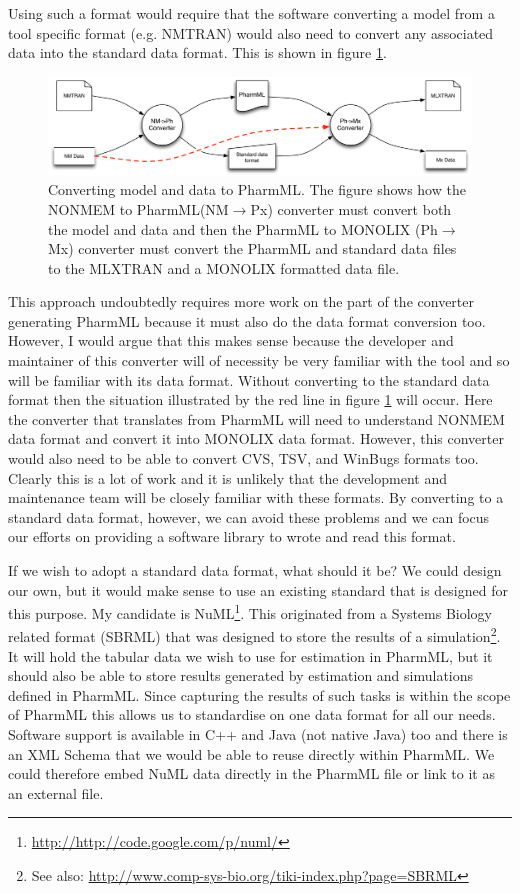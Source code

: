\documentclass[a4paper,11pt]{article}
\newcommand{\pharmml}{PharmML\xspace}
\begin{document}
Using such a format would require that the software converting a model
from a tool specific format (e.g. NMTRAN) would also need to convert
any associated data into the standard data format. This is shown in
figure \ref{fig:data-conversion}.

\begin{figure}[htbp]
\centering
\includegraphics[width=\linewidth]{DataConversion}
\caption{Converting model and data to \pharmml. The figure shows how
  the NONMEM to \pharmml (NM$\rightarrow$Px) converter must convert both the
  model and data and then the \pharmml to MONOLIX (Ph$\rightarrow$Mx) converter
  must convert the \pharmml and standard data files to the MLXTRAN and a
  MONOLIX formatted data file.}
\label{fig:data-conversion}
\end{figure}

This approach undoubtedly requires more work on the part of the
converter generating \pharmml because it must also do the data format
conversion too. However, I would argue that this makes sense because
the developer and maintainer of this converter will of necessity be
very familiar with the tool and so will be familiar with its data
format. Without converting to the standard data format then the
situation illustrated by the red line in figure \ref{fig:data-conversion}
will occur. Here the converter that translates from \pharmml will need
to understand NONMEM data format and convert it into MONOLIX data
format. However, this converter would also need to be able to convert
CVS, TSV, and WinBugs formats too. Clearly this is a lot of work and
it is unlikely that the development and maintenance team will be
closely familiar with these formats. By converting to a standard data
format, however, we can avoid these problems and we can focus our
efforts on providing a software library to wrote and read this
format.

If we wish to adopt a standard data format, what should it be? We
could design our own, but it would make sense to use an existing
standard that is designed for this purpose. My candidate is
NuML\footnote{\url{http://http://code.google.com/p/numl/}}. This
originated from a Systems Biology related format (SBRML) that was
designed to store the results of a simulation\footnote{See also:
  \url{http://www.comp-sys-bio.org/tiki-index.php?page=SBRML}}. It
will hold the tabular data we wish to use for estimation in \pharmml,
but it should also be able to store results generated by estimation
and simulations defined in \pharmml. Since capturing the results of
such tasks is within the scope of \pharmml this allows us to
standardise on one data format for all our needs. Software support is
available in C++ and Java (not native Java) too and there is an XML
Schema that we would be able to reuse directly within \pharmml. We
could therefore embed NuML data directly in the \pharmml file or link
to it as an external file.
\end{document}
